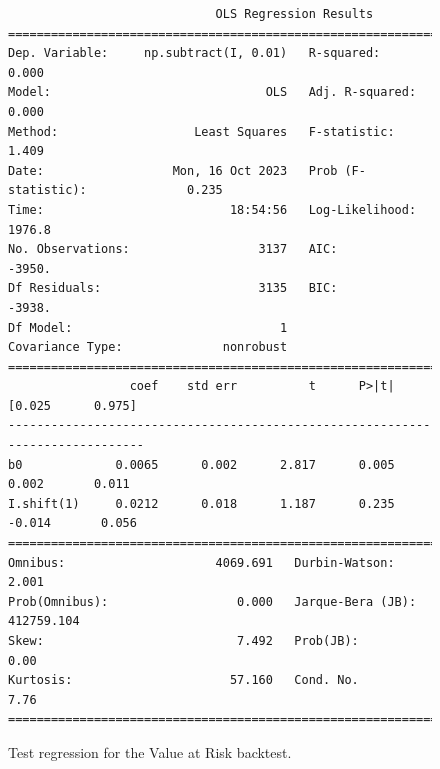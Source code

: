 \documentclass[12pt, a4paper]{article}
\begin{document}
\begin{figure}[H]
\footnotesize
\begin{verbatim}
                             OLS Regression Results
================================================================================
Dep. Variable:     np.subtract(I, 0.01)   R-squared:                       0.000
Model:                              OLS   Adj. R-squared:                  0.000
Method:                   Least Squares   F-statistic:                     1.409
Date:                  Mon, 16 Oct 2023   Prob (F-statistic):              0.235
Time:                          18:54:56   Log-Likelihood:                 1976.8
No. Observations:                  3137   AIC:                            -3950.
Df Residuals:                      3135   BIC:                            -3938.
Df Model:                             1
Covariance Type:              nonrobust
==============================================================================
                 coef    std err          t      P>|t|      [0.025      0.975]
------------------------------------------------------------------------------
b0             0.0065      0.002      2.817      0.005       0.002       0.011
I.shift(1)     0.0212      0.018      1.187      0.235      -0.014       0.056
==============================================================================
Omnibus:                     4069.691   Durbin-Watson:                   2.001
Prob(Omnibus):                  0.000   Jarque-Bera (JB):           412759.104
Skew:                           7.492   Prob(JB):                         0.00
Kurtosis:                      57.160   Cond. No.                         7.76
==============================================================================
\end{verbatim}
\caption{Test regression for the Value at Risk backtest.}\label{fig:var}
\end{figure}
\end{document}
